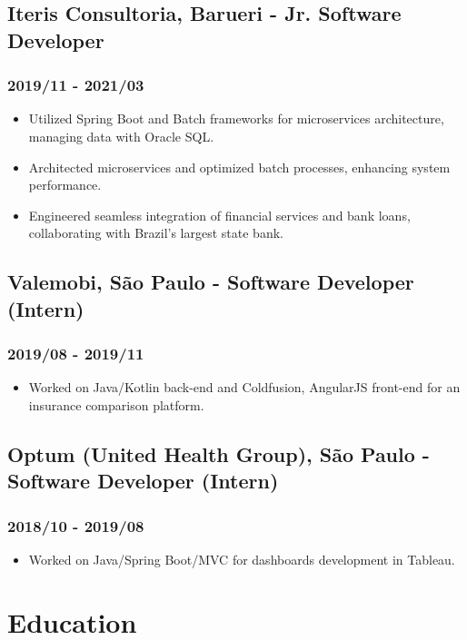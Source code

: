 \documentclass[a4paper,10pt]{article}
\begin{document}
\subsection*{Iteris Consultoria, Barueri - Jr. Software Developer}
\subsubsection*{2019/11 - 2021/03}
\begin{itemize}
    \item Utilized Spring Boot and Batch frameworks for microservices architecture, managing data with Oracle SQL.
    \item Architected microservices and optimized batch processes, enhancing system performance.
    \item Engineered seamless integration of financial services and bank loans, collaborating with Brazil's largest state bank.
\end{itemize}

\subsection*{Valemobi, São Paulo - Software Developer (Intern)}
\subsubsection*{2019/08 - 2019/11}
\begin{itemize}
    \item Worked on Java/Kotlin back-end and Coldfusion, AngularJS front-end for an insurance comparison platform.
\end{itemize}

\subsection*{Optum (United Health Group), São Paulo - Software Developer (Intern)}
\subsubsection*{2018/10 - 2019/08}
\begin{itemize}
    \item Worked on Java/Spring Boot/MVC for dashboards development in Tableau.
\end{itemize}

\section*{Education}
\end{document}
